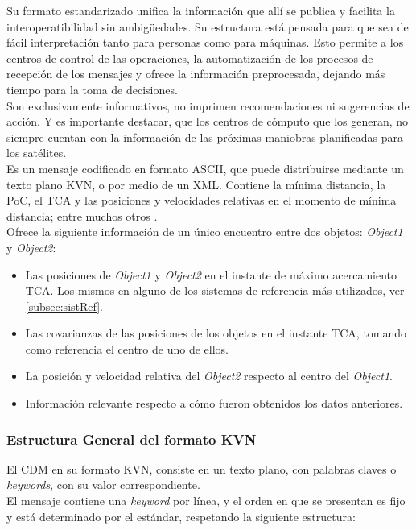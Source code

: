 {Su formato estandarizado unifica la informaci\'on que all\'i se publica y facilita la interoperatibilidad sin ambig\"{u}edades. Su estructura est\'a pensada para que sea de f\'acil interpretaci\'on tanto para personas como para m\'aquinas. Esto permite a los centros de control de las operaciones, la automatizaci\'on de los procesos de recepci\'on de los mensajes y ofrece la informaci\'on preprocesada, dejando m\'as tiempo para la toma de decisiones.\\

Son exclusivamente informativos, no imprimen recomendaciones ni sugerencias de acci\'on.
Y es importante destacar, que los centros de c\'omputo que los generan, no siempre cuentan con la informaci\'on de las pr\'oximas maniobras planificadas para los sat\'elites.\\

Es un mensaje codificado en formato ASCII, que puede distribuirse mediante un texto plano KVN, o por medio de un \ac{XML}. Contiene la m\'inima distancia, la PoC, el TCA y las posiciones y velocidades relativas en el momento de m\'inima distancia; entre muchos otros \citep{CDM}.\\

Ofrece la siguiente informaci\'on de un \'unico encuentro entre dos objetos: {\it{Object1}} y {\it{Object2}}:
\begin{itemize}
\item Las posiciones de  {\it{Object1}} y  {\it{Object2}} en el instante de m\'aximo acercamiento TCA. Los mismos en alguno de los sistemas de referencia m\'as utilizados, ver \ref{subsec:sistRef}.
\item Las covarianzas de las posiciones de los objetos en el instante TCA, tomando como referencia el centro de uno de ellos.
\item La posici\'on y velocidad relativa del {\it{Object2}} respecto al centro del {\it{Object1}}.
\item Informaci\'on relevante respecto a c\'omo fueron obtenidos los datos anteriores.
\end{itemize}


\subsubsection*{Estructura General del formato KVN}
El CDM en su formato KVN, consiste en un texto plano, con palabras claves o {\it{keywords}}, con su valor correspondiente.\\
El mensaje contiene una {\it{keyword}} por l\'inea, y el orden en que se presentan es fijo y est\'a determinado por el est\'andar, respetando la siguiente estructura:

}
